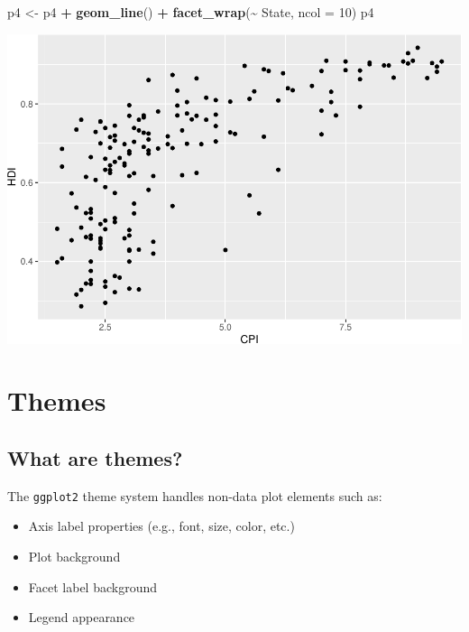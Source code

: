 \documentclass[
]{book}
\newenvironment{Shaded}{\begin{snugshade}}{\end{snugshade}}
\newcommand{\DataTypeTok}[1]{\textcolor[rgb]{0.13,0.29,0.53}{#1}}
\newcommand{\DecValTok}[1]{\textcolor[rgb]{0.00,0.00,0.81}{#1}}
\newcommand{\KeywordTok}[1]{\textcolor[rgb]{0.13,0.29,0.53}{\textbf{#1}}}
\newcommand{\NormalTok}[1]{#1}
\newcommand{\OperatorTok}[1]{\textcolor[rgb]{0.81,0.36,0.00}{\textbf{#1}}}
\newcommand{\StringTok}[1]{\textcolor[rgb]{0.31,0.60,0.02}{#1}}
\providecommand{\tightlist}{%
  \setlength{\itemsep}{0pt}\setlength{\parskip}{0pt}}
\begin{document}
\begin{Shaded}
\begin{Highlighting}[]
\NormalTok{p4 \textless{}{-}}\StringTok{ }\NormalTok{p4 }\OperatorTok{+}\StringTok{ }\KeywordTok{geom\_line}\NormalTok{() }\OperatorTok{+}
\StringTok{   }\KeywordTok{facet\_wrap}\NormalTok{(}\OperatorTok{\textasciitilde{}}\StringTok{ }\NormalTok{State, }\DataTypeTok{ncol =} \DecValTok{10}\NormalTok{)}
\NormalTok{p4}
\end{Highlighting}
\end{Shaded}

\includegraphics{R/Rgraphics/figures/unnamed-chunk-194-1.pdf}

\hypertarget{themes}{%
\section{Themes}\label{themes}}

\hypertarget{what-are-themes}{%
\subsection{What are themes?}\label{what-are-themes}}

The \texttt{ggplot2} theme system handles non-data plot elements such as:

\begin{itemize}
\tightlist
\item
  Axis label properties (e.g., font, size, color, etc.)
\item
  Plot background
\item
  Facet label background
\item
  Legend appearance
\end{itemize}
\end{document}
